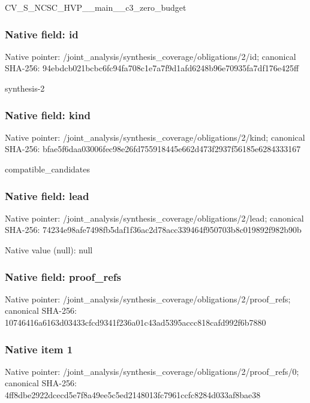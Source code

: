 \documentclass[10pt,a4paper]{article}
\begin{document}
\begingroup\raggedright\sloppy CV\_\allowbreak{}S\_\allowbreak{}NCSC\_\allowbreak{}HVP\_\allowbreak{}\_\allowbreak{}main\_\allowbreak{}\_\allowbreak{}c3\_\allowbreak{}zero\_\allowbreak{}budget\par\endgroup

\subsubsection{Native field: id}
Native pointer: /joint\_\allowbreak{}analysis/synthesis\_\allowbreak{}coverage/obligations/2/id; canonical SHA-256: 94ebdcb021bcbc6fc94fa708c1e7a7f9d1afd6248b96e70935fa7df176e425ff

\begingroup\raggedright\sloppy synthesis-2\par\endgroup

\subsubsection{Native field: kind}
Native pointer: /joint\_\allowbreak{}analysis/synthesis\_\allowbreak{}coverage/obligations/2/kind; canonical SHA-256: bfae5f6daa03006fec98e26fd755918445e662d473f2937f56185e6284333167

\begingroup\raggedright\sloppy compatible\_\allowbreak{}candidates\par\endgroup

\subsubsection{Native field: lead}
Native pointer: /joint\_\allowbreak{}analysis/synthesis\_\allowbreak{}coverage/obligations/2/lead; canonical SHA-256: 74234e98afe7498fb5daf1f36ac2d78acc339464f950703b8c019892f982b90b

Native value (null): null

\subsubsection{Native field: proof\_\allowbreak{}refs}
Native pointer: /joint\_\allowbreak{}analysis/synthesis\_\allowbreak{}coverage/obligations/2/proof\_\allowbreak{}refs; canonical SHA-256: 10746416a6163d03433cfcd9341f236a01c43ad5395accc818cafd992f6b7880

\subsubsection{Native item 1}
Native pointer: /joint\_\allowbreak{}analysis/synthesis\_\allowbreak{}coverage/obligations/2/proof\_\allowbreak{}refs/0; canonical SHA-256: 4ff8dbe2922dcecd5e7f8a49ee5c5ed2148013fc7961ccfc8284d033af8bae38
\end{document}
